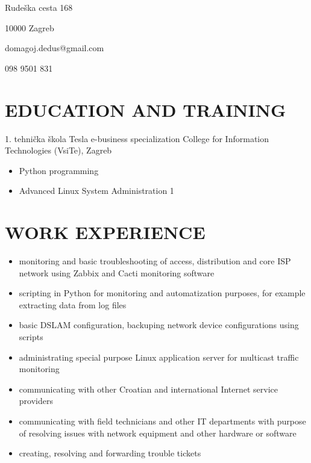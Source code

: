 \documentclass{my_cv}
\begin{document}

Rudeška cesta 168

10000 Zagreb

domagoj.dedus@gmail.com

098 9501 831
\section{EDUCATION AND TRAINING}
1. tehnička škola Tesla
e-business specialization
College for Information Technologies (VsiTe), Zagreb
\begin{itemize}
    \setlength\itemsep{0.1cm}
    \item Python programming
    \item Advanced Linux System Administration 1
\end{itemize}

\section{WORK EXPERIENCE}
\begin{itemize}
    \setlength\itemsep{0.1cm}
    \item monitoring and basic troubleshooting of access, distribution and core ISP network using Zabbix and
Cacti monitoring software
    \item scripting in Python for monitoring and automatization purposes, for example extracting data from log
files
    \item basic DSLAM configuration, backuping network device configurations using scripts
    \item administrating special purpose Linux application server for multicast traffic monitoring
    \item communicating with other Croatian and international Internet service providers
    \item communicating with field technicians and other IT departments with purpose of resolving issues with
network equipment and other hardware or software
    \item creating, resolving and forwarding trouble tickets
\end{itemize}
\end{document}
